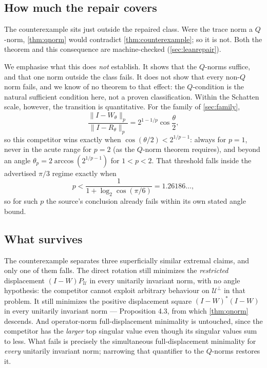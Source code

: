 \documentclass[11pt]{article}
\theoremstyle{definition}
\begin{document}
\subsection{How much the repair covers}

The counterexample sits just outside the repaired class.  Were the trace norm
a $Q$-norm, \cref{thm:qnorm} would contradict \cref{thm:counterexample}; so it
is not.  Both the theorem and this consequence are machine-checked
(\cref{sec:leanrepair}).

We emphasise what this does \emph{not} establish.  It shows that the $Q$-norms
suffice, and that one norm outside the class fails.  It does not show that
every non-$Q$ norm fails, and we know of no theorem to that effect: the
$Q$-condition is the natural sufficient condition here, not a proven
classification.  Within the Schatten scale, however, the transition is
quantitative.  For the family of \cref{sec:family},
\[
 \frac{\lVert I-W_\theta\rVert_p}{\lVert I-R_\theta\rVert_p}
 =2^{1-1/p}\cos\frac\theta2 ,
\]
so this competitor wins exactly when $\cos(\theta/2)<2^{1/p-1}$: always for
$p=1$, never in the acute range for $p=2$ (as the $Q$-norm theorem requires),
and beyond an angle $\theta_p=2\arccos(2^{1/p-1})$ for $1<p<2$.  That threshold
falls inside the advertised $\pi/3$ regime exactly when
\[
 p<\frac1{1+\log_2\cos(\pi/6)}=1.26186\ldots,
\]
so for such $p$ the source's conclusion already fails within its own stated
angle bound.

\subsection{What survives}

The counterexample separates three superficially similar extremal claims, and
only one of them falls.  The direct rotation still minimizes the
\emph{restricted} displacement $(I-W)P_{\mathcal U}$ in every unitarily
invariant norm, with no angle hypothesis: the competitor cannot exploit
arbitrary behaviour on $\mathcal U^\perp$ in that problem.  It still minimizes
the positive displacement square $(I-W)^*(I-W)$ in every unitarily invariant
norm --- Proposition 4.3, from which \cref{thm:qnorm} descends.  And
operator-norm full-displacement minimality is untouched, since the competitor
has the \emph{larger} top singular value even though its singular values sum to
less.  What fails is precisely the simultaneous full-displacement minimality
for \emph{every} unitarily invariant norm; narrowing that quantifier to the
$Q$-norms restores it.
\end{document}
